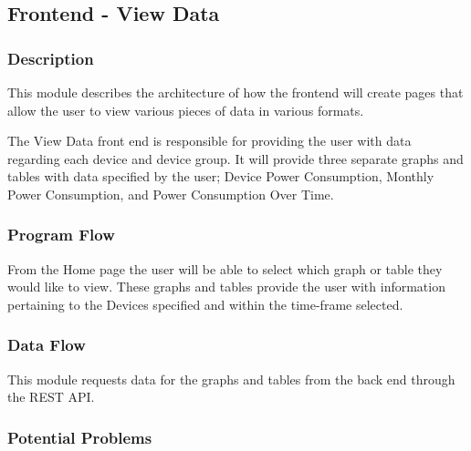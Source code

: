 
\subsection{Frontend - View Data}

\subsubsection{Description}

This module describes the architecture of how the frontend will create pages that allow the user to view various pieces of data in various formats.

The View Data front end is responsible for providing the user with data regarding each device and device group. 
It will provide three separate graphs and tables with data specified by the user; 
Device Power Consumption, Monthly Power Consumption, and Power Consumption Over Time. 


\subsubsection{Program Flow}

From the Home page the user will be able to select which graph or table they would like to view.  
These graphs and tables provide the user with information pertaining to the Devices specified and within the time-frame selected.  

\subsubsection{Data Flow}

This module requests data for the graphs and tables from the back end through the REST API. 





\subsubsection{Potential Problems}



